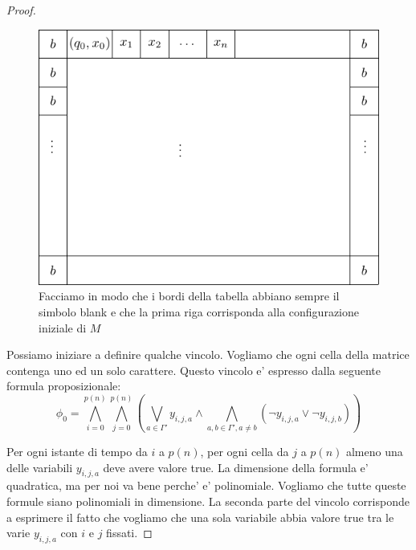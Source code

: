 \begin{proof}
    \begin{figure}[h]
        \begin{center}
            \includegraphics{./img/nondeterminism/SATproof2.pdf}
            \caption{Facciamo in modo che i bordi della tabella abbiano sempre il simbolo blank e
            che la prima riga corrisponda alla configurazione iniziale di $M$}
        \end{center}
    \end{figure}


    Possiamo iniziare a definire qualche vincolo. Vogliamo che ogni cella della matrice contenga uno ed
    un solo carattere. Questo vincolo e' espresso dalla seguente formula proposizionale:
    \begin{equation*}
        \phi_{0} = \bigwedge_{i=0}^{p(n)}\bigwedge_{j=0}^{p(n)}\left(\bigvee_{a \in \Gamma'}
            y_{i,j,a}
        \land \bigwedge_{a,b \in \Gamma',a \not= b}(\lnot y_{i,j,a} \lor \lnot y_{i,j,b})\right)
    \end{equation*}
    
    Per ogni istante di tempo da $i$ a $p(n)$, per ogni cella da $j$ a $p(n)$ almeno una delle
    variabili $y_{i,j,a}$ deve avere valore true. La dimensione della formula e' quadratica, ma per
    noi va bene perche' e' polinomiale. Vogliamo che tutte queste formule siano polinomiali in
    dimensione. La seconda parte del vincolo corrisponde a esprimere il fatto che vogliamo che una
    sola variabile abbia valore true tra le varie $y_{i,j,a}$ con $i$ e $j$ fissati.


\end{proof}
